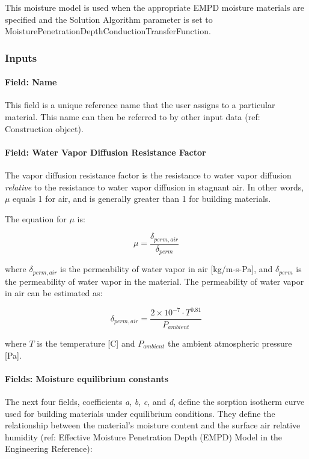 This moisture model is used when the appropriate EMPD moisture
materials are specified and the Solution Algorithm parameter is set to
MoisturePenetrationDepthConductionTransferFunction.

\subsubsection{Inputs}\label{empd-inputs}

\paragraph{Field: Name}\label{materialpropertymoisturepenetrationdepthsettings-field-name}

This field is a unique reference name that the user assigns to a
particular material. This name can then be referred to by other input
data (ref: Construction object).

\paragraph{Field: Water Vapor Diffusion Resistance
	Factor}\label{field-water-vapor-diffusion-resistance-factor}

The vapor diffusion resistance factor is the resistance to water vapor
diffusion \emph{relative} to the resistance to water vapor diffusion in
stagnant air. In other words, \(\mu\) equals 1 for air, and is generally
greater than 1 for building materials.

The equation for \(\mu\) is:

\[ \mu = \frac {\delta_{perm,air}} {\delta_{perm}} \]

where \(\delta_{perm,air}\) is the permeability of water vapor in air
{[}kg/m-s-Pa{]}, and \(\delta_{perm}\) is the permeability of water
vapor in the material. The permeability of water vapor in air can be
estimated as:

\[ \delta_{perm,air} = \frac {2 \times 10^{-7} \cdot T^{0.81}} {P_{ambient}} \]

where \(T\) is the temperature {[}C{]} and \(P_{ambient}\) the ambient
atmospheric pressure {[}Pa{]}.

\paragraph{Fields: Moisture equilibrium
	constants}\label{fields-moisture-equilibrium-constants}

The next four fields, coefficients \emph{a}, \emph{b}, \emph{c}, and \emph{d},
define the sorption isotherm curve used for building materials under
equilibrium conditions. They define the relationship between
the material's moisture content and the surface air relative humidity
(ref: Effective Moisture Penetration Depth (EMPD) Model in the
Engineering Reference):

